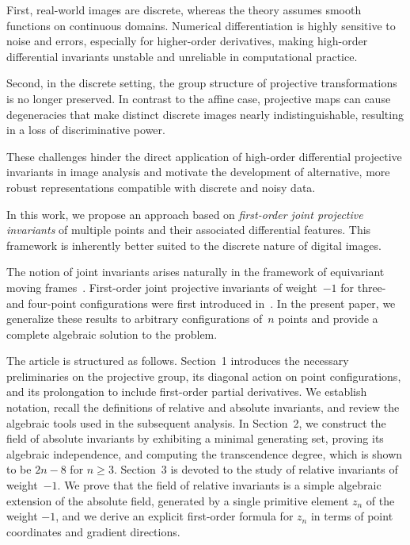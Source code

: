 \documentclass[12pt,reqno]{amsart}
\begin{document}
First, real-world images are discrete, whereas the theory assumes smooth functions on continuous domains. Numerical differentiation is highly sensitive to noise and errors, especially for higher-order derivatives, making high-order differential invariants unstable and unreliable in computational practice.

Second, in the discrete setting, the group structure of projective transformations is no longer preserved. In contrast to the affine case, projective maps can cause degeneracies that make distinct discrete images nearly indistinguishable, resulting in a loss of discriminative power.

These challenges hinder the direct application of high-order differential projective invariants in image analysis and motivate the development of alternative, more robust representations compatible with discrete and noisy data.

In this work, we propose an  approach based on \emph{first-order joint projective invariants} of multiple points and their associated differential features. This framework is inherently better suited to the discrete nature of digital images.

The notion of joint invariants arises naturally in the framework of equivariant moving frames~\cite{Olver1999, Olver2001, Olver2020}. First-order joint projective invariants of weight~$-1$ for three- and four-point configurations were first introduced in~\cite{Wang}. In the present paper, we generalize these results to arbitrary configurations of~$n$ points and provide a complete algebraic solution to the problem.

The article is structured as follows. Section~1 introduces the necessary preliminaries on the projective group, its diagonal action on point configurations, and its prolongation to include first-order partial derivatives.
 We establish notation, recall the definitions of relative and absolute invariants, and review the algebraic tools used in the subsequent analysis. In Section~2, we construct the field of absolute invariants by exhibiting a minimal generating set, proving its algebraic independence, and computing the transcendence degree, which is shown to be \(2n - 8\) for \(n \ge 3\). Section~3 is devoted to the study of relative invariants of weight~$-1$. We prove that the field of relative invariants is a simple algebraic extension of the absolute field, generated by a single primitive element \(z_n\) of the weight $-1$, and we derive an explicit first-order formula for \(z_n\) in terms of point coordinates and gradient directions.
\end{document}

